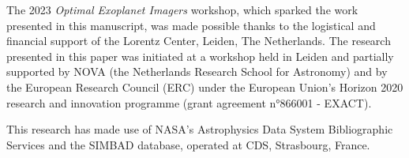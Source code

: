 \documentclass[usenatbib]{mnras}
\begin{document}
%
%
%
%
%
%
%
%
%

The 2023 \emph{Optimal Exoplanet Imagers} workshop, which sparked the work presented in this manuscript, was made possible thanks to the logistical and financial support of the Lorentz Center, Leiden, The Netherlands.
%
The research presented in this paper was initiated at a workshop held in Leiden and partially supported by NOVA (the Netherlands Research School for Astronomy) and by the European Research Council (ERC) under the European Union's Horizon 2020 research and innovation programme (grant agreement n°866001 - EXACT).

This research has made use of NASA's Astrophysics Data System Bibliographic Services and the SIMBAD database, operated at CDS, Strasbourg, France. 
\end{document}

